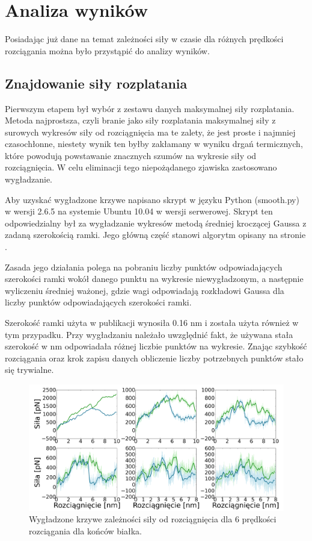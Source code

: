 \chapter{Analiza wyników}

Posiadając już dane na temat zależności siły w czasie dla różnych prędkości rozciągania można było przystąpić do analizy wyników.

\section{Znajdowanie siły rozplatania}

Pierwszym etapem był wybór z zestawu danych maksymalnej siły rozplatania. Metoda najprostsza, czyli branie jako siły rozplatania maksymalnej siły z surowych wykresów siły od rozciągnięcia ma te zalety, że jest proste i najmniej czasochłonne, niestety wynik ten byłby zakłamany w wyniku drgań termicznych, które powodują powstawanie znacznych szumów na wykresie siły od rozciągnięcia. W celu eliminacji tego niepożądanego zjawiska zastosowano wygładzanie.

Aby uzyskać wygładzone krzywe napisano skrypt w języku Python (smooth.py) w wersji 2.6.5 na systemie Ubuntu 10.04 w wersji serwerowej. Skrypt ten odpowiedzialny był za wygładzanie wykresów metodą średniej kroczącej Gaussa z zadaną szerokością ramki. Jego główną część stanowi algorytm opisany na stronie \cite{gauss}. 

Zasada jego działania polega na pobraniu liczby punktów odpowiadających szerokości ramki wokół danego punktu na wykresie niewygładzonym, a następnie wyliczeniu średniej ważonej, gdzie wagi odpowiadają rozkładowi Gaussa dla liczby punktów odpowiadających szerokości ramki.

Szerokość ramki użyta w publikacji \cite{1tki} wynosiła 0.16 nm i została użyta również w tym przypadku. Przy wygładzaniu należało uwzględnić fakt, że używana stała szerokość w nm odpowiadała różnej liczbie punktów na wykresie. Znając szybkość rozciągania oraz krok zapisu danych obliczenie liczby potrzebnych punktów stało się trywialne.

\begin{center}
\begin{figure}[h]
\begin{centering}
\includegraphics[width=150mm]{./rys/smooth.png}
\caption{Wygładzone krzywe zależności siły od rozciągnięcia dla 6 prędkości rozciągania dla końców białka.}
\end{centering}
\end{figure}

\end{center}

